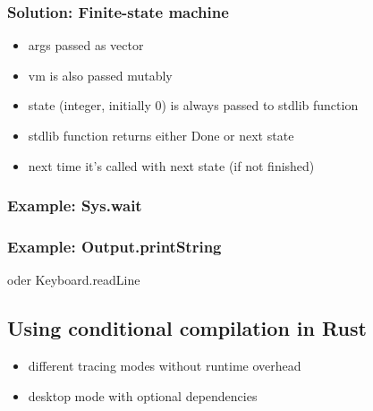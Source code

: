 \subsubsection{Solution: Finite-state machine}
\begin{itemize}
  \item args passed as vector
  \item vm is also passed mutably
  \item state (integer, initially 0) is always passed to stdlib function
  \item stdlib function returns either Done or next state
  \item next time it's called with next state (if not finished)
\end{itemize}
\subsubsection{Example: Sys.wait}
\subsubsection{Example: Output.printString}
oder Keyboard.readLine
\subsection{Using conditional compilation in Rust} \label{conditional-compilation}
\begin{itemize}
  \item different tracing modes without runtime overhead
  \item desktop mode with optional dependencies
\end{itemize}

